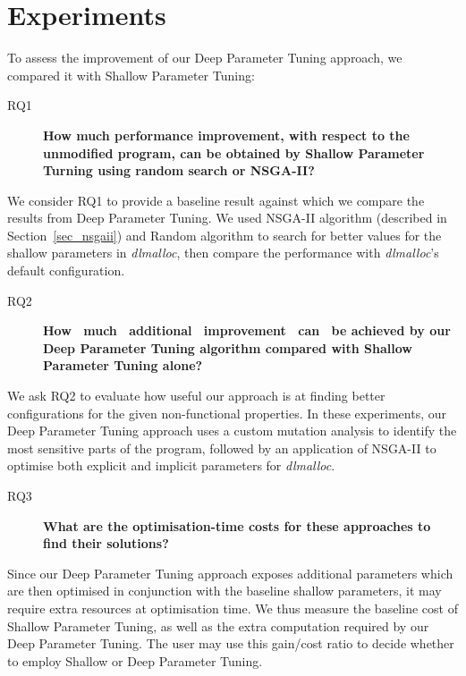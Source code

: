 \vspace{-0.5em}
\section{Experiments}

To assess the improvement of our Deep Parameter Tuning approach, we compared it with Shallow Parameter Tuning: 
 

\begin{description}
 \item[RQ1] {\bf How much performance improvement, with respect to the unmodified program, can be obtained by Shallow Parameter Turning using random search or NSGA-II? }
\end{description}

We consider RQ1 to provide a baseline result against which we compare the results from Deep Parameter Tuning.
We used NSGA-II algorithm (described in Section~\ref{sec_nsgaii}) and Random algorithm to search for better values for the shallow parameters in \emph{dlmalloc}, then compare the performance with \emph{dlmalloc}'s default configuration. 

\begin{description}
\item[RQ2] {\bf How ~much ~additional ~improvement ~can ~be achieved by our Deep Parameter Tuning algorithm compared with Shallow Parameter Tuning alone? }
\end{description}

We ask RQ2 to evaluate how useful our approach is at finding better configurations for the given non-functional properties. 
In these experiments, our Deep Parameter Tuning approach uses a custom mutation analysis to identify the most sensitive parts of the program, 
followed by an application of NSGA-II to optimise both explicit and implicit parameters for \emph{dlmalloc}. 

\begin{description}
\item[RQ3] {\bf What are the optimisation-time costs for these approaches to find their solutions? }
\end{description} 

Since our Deep Parameter Tuning approach exposes additional parameters
which are then optimised in conjunction with the baseline shallow
parameters, it may require extra resources at optimisation time.  
We thus measure the baseline cost of Shallow Parameter Tuning, as
well as the extra computation required by our Deep Parameter
Tuning. The user may use this gain/cost ratio to
decide whether to employ Shallow or Deep Parameter Tuning.

